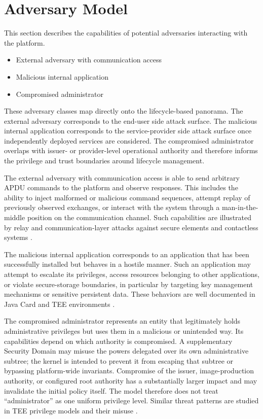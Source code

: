 \section{Adversary Model}

This section describes the capabilities of potential adversaries interacting
with the platform.

\begin{itemize}
\item External adversary with communication access
\item Malicious internal application
\item Compromised administrator
\end{itemize}

These adversary classes map directly onto the lifecycle-based panorama. The
external adversary corresponds to the end-user side attack surface. The
malicious internal application corresponds to the service-provider side attack
surface once independently deployed services are considered. The compromised
administrator overlaps with issuer- or provider-level operational authority and
therefore informs the privilege and trust boundaries around lifecycle
management.

The external adversary with communication access is able to send arbitrary APDU
commands to the platform and observe responses. This includes the ability to
inject malformed or malicious command sequences, attempt replay of previously
observed exchanges, or interact with the system through a man-in-the-middle
position on the communication channel. Such capabilities are illustrated by
relay and communication-layer attacks against secure elements and contactless
systems \cite{roland2012relay, francis2011relay, zhao2021sim}.

The malicious internal application corresponds to an application that has been
successfully installed but behaves in a hostile manner. Such an application may
attempt to escalate its privileges, access resources belonging to other
applications, or violate secure-storage boundaries, in particular by targeting
key management mechanisms or sensitive persistent data. These behaviors are
well documented in Java Card and TEE environments \cite{mostowski2008malicious,
barbu2010javacard, lanet2012handson, bouffard2012nightmare, bouffard2015cft,
busch2020trustedcore}.

The compromised administrator represents an entity that legitimately holds
administrative privileges but uses them in a malicious or unintended way. Its
capabilities depend on which authority is compromised. A supplementary
Security Domain may misuse the powers delegated over its own administrative
subtree; the kernel is intended to prevent it from escaping that subtree or
bypassing platform-wide invariants. Compromise of the issuer, image-production
authority, or configured root authority has a substantially larger impact and
may invalidate the initial policy itself. The model therefore does not treat
``administrator'' as one uniform privilege level. Similar threat patterns are
studied in TEE privilege models and their misuse
\cite{cerdeira2022rezone, munoz2023tee}.

